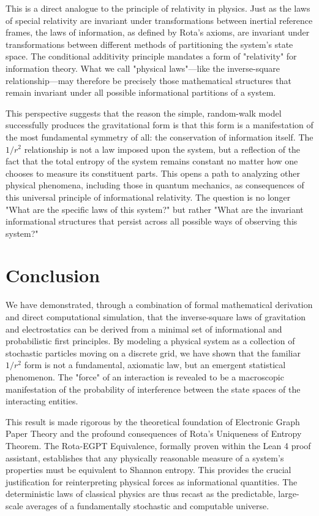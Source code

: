 \documentclass[11pt, letterpaper]{article}
\begin{document}
This is a direct analogue to the principle of relativity in physics. Just as the laws of special relativity are invariant under transformations between inertial reference frames, the laws of information, as defined by Rota's axioms, are invariant under transformations between different methods of partitioning the system's state space. The conditional additivity principle mandates a form of "relativity" for information theory. What we call "physical laws"—like the inverse-square relationship—may therefore be precisely those mathematical structures that remain invariant under all possible informational partitions of a system.

This perspective suggests that the reason the simple, random-walk model successfully produces the gravitational form is that this form is a manifestation of the most fundamental symmetry of all: the conservation of information itself. The $1/r^2$ relationship is not a law imposed upon the system, but a reflection of the fact that the total entropy of the system remains constant no matter how one chooses to measure its constituent parts. This opens a path to analyzing other physical phenomena, including those in quantum mechanics, as consequences of this universal principle of informational relativity. The question is no longer "What are the specific laws of this system?" but rather "What are the invariant informational structures that persist across all possible ways of observing this system?"


\section{Conclusion}

We have demonstrated, through a combination of formal mathematical derivation and direct computational simulation, that the inverse-square laws of gravitation and electrostatics can be derived from a minimal set of informational and probabilistic first principles. By modeling a physical system as a collection of stochastic particles moving on a discrete grid, we have shown that the familiar $1/r^2$ form is not a fundamental, axiomatic law, but an emergent statistical phenomenon. The "force" of an interaction is revealed to be a macroscopic manifestation of the probability of interference between the state spaces of the interacting entities.

This result is made rigorous by the theoretical foundation of Electronic Graph Paper Theory and the profound consequences of Rota's Uniqueness of Entropy Theorem. The Rota-EGPT Equivalence, formally proven within the Lean 4 proof assistant, establishes that any physically reasonable measure of a system's properties must be equivalent to Shannon entropy. This provides the crucial justification for reinterpreting physical forces as informational quantities. The deterministic laws of classical physics are thus recast as the predictable, large-scale averages of a fundamentally stochastic and computable universe.
\end{document}
